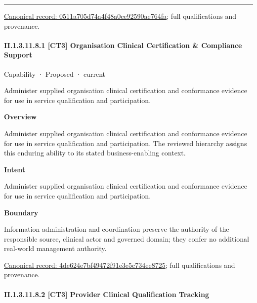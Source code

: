 \medskip\hrule\medskip

{\footnotesize \href{../../../../continuum/strategy/capability/0511a705d74a4f48a0ce92590ae764fa.md}{Canonical record: 0511a705d74a4f48a0ce92590ae764fa}; full qualifications and provenance.}\par
\paragraph*{II.1.3.11.8.1 [CT3] Organisation Clinical Certification \& Compliance Support}
\label{navigation:II.1.3.11.8.1}

\label{element:4de624e7bf49472f91e3e5c734ee8725}
{\small Capability · Proposed · current}\par

Administer supplied organisation clinical certification and conformance evidence for use in service qualification and participation.



\textbf{Overview}



Administer supplied organisation clinical certification and conformance evidence for use in service qualification and participation. The reviewed hierarchy assigns this enduring ability to its stated business-enabling context.



\textbf{Intent}



Administer supplied organisation clinical certification and conformance evidence for use in service qualification and participation.



\textbf{Boundary}



Information administration and coordination preserve the authority of the responsible source, clinical actor and governed domain; they confer no additional real-world management authority.


{\footnotesize \href{../../../../continuum/strategy/capability/4de624e7bf49472f91e3e5c734ee8725.md}{Canonical record: 4de624e7bf49472f91e3e5c734ee8725}; full qualifications and provenance.}\par
\paragraph*{II.1.3.11.8.2 [CT3] Provider Clinical Qualification Tracking}
\label{navigation:II.1.3.11.8.2}

